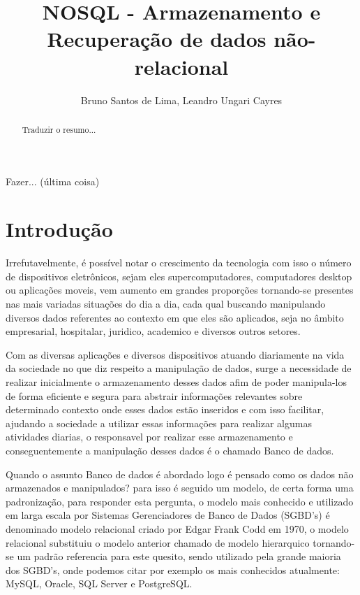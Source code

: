 \documentclass[12pt]{article}
\title{NOSQL - Armazenamento e Recuperação de dados não-relacional}
\author{Bruno Santos de Lima\inst{1}, Leandro Ungari Cayres\inst{1} }
\begin{document}
 

\maketitle

\begin{abstract}
Traduzir o resumo...
\end{abstract}
     
\begin{resumo} 
Fazer... (última coisa)
\end{resumo}


\section{Introdução}
\label{sec:intro}
Irrefutavelmente, é possível notar o crescimento da tecnologia com isso o número de dispositivos eletrônicos, sejam eles supercomputadores, computadores desktop ou aplicações moveis, vem aumento em grandes proporções tornando-se presentes nas mais variadas situações do dia a dia, cada qual buscando manipulando diversos dados referentes ao contexto em que eles são aplicados, seja no âmbito empresarial, hospitalar, juridico, academico e diversos outros setores.

Com as diversas aplicações e diversos dispositivos atuando diariamente na vida da sociedade no que diz respeito a manipulação de dados, surge a necessidade de realizar inicialmente o armazenamento desses dados afim de poder manipula-los de forma eficiente e segura para abstrair informações relevantes sobre determinado contexto onde esses dados estão inseridos e com isso facilitar, ajudando a sociedade a utilizar essas informações para realizar algumas atividades diarias, o responsavel por realizar esse armazenamento e conseguentemente a manipulação desses dados é o chamado Banco de dados.

Quando o assunto Banco de dados é abordado logo é pensado como os dados não armazenados e manipulados? para isso é seguido um modelo, de certa forma uma padronização, para responder esta pergunta, o modelo mais conhecido e utilizado em larga escala por Sistemas Gerenciadores de Banco de Dados (SGBD's) é denominado modelo relacional \cite{codd:1970} criado por Edgar Frank Codd em 1970, o modelo relacional substituiu o modelo anterior chamado de modelo hierarquico tornando-se um padrão referencia para este quesito, sendo utilizado pela grande maioria dos SGBD's, onde podemos citar por exemplo os mais conhecidos atualmente: MySQL, Oracle, SQL Server e PostgreSQL. \cite{brito2010bancos}
\end{document}
